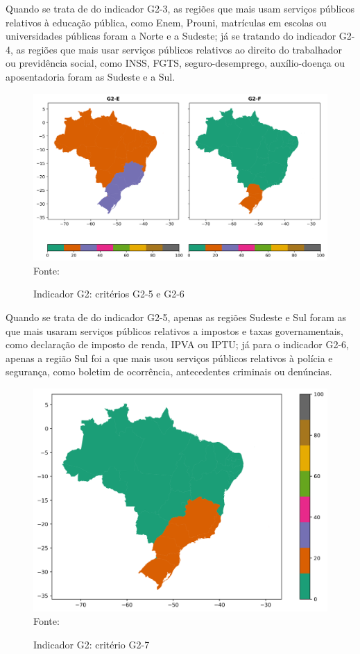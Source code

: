 Quando se trata de do indicador G2-3, as regiões que mais usam serviços públicos relativos à educação pública, como Enem, Prouni, matrículas em escolas ou universidades públicas foram a Norte e a Sudeste; já se tratando do indicador G2-4, as regiões que mais usar serviços públicos relativos ao direito do trabalhador ou previdência social, como INSS, FGTS, seguro-desemprego, auxílio-doença ou aposentadoria foram as Sudeste e a Sul.

\begin{figure}[H]
	\centering
	\caption{Indicador G2: critérios G2-5 e G2-6}
	\includegraphics[width=1\linewidth]{figuras/mapa_coropleto_tic_domicilio_g2_E_F.png}
	\label{fig:mapa_coropleto_tic_domicilio_g2_E_F}
	\footnotesize{Fonte: \cite{tic_domicilios_2024_g2}}
\end{figure}

Quando se trata de do indicador G2-5, apenas as regiões Sudeste e Sul foram as que mais usaram serviços públicos relativos a impostos e taxas governamentais, como declaração de imposto de renda, IPVA ou IPTU; já para o indicador G2-6, apenas a região Sul foi a que mais usou serviços públicos relativos à polícia e segurança, como boletim de ocorrência, antecedentes criminais ou denúncias.

\begin{figure}[H]
	\centering
	\caption{Indicador G2: critério G2-7}
	\includegraphics[width=1\linewidth]{figuras/mapa_coropleto_tic_domicilio_g2_G.png}
	\label{fig:mapa_coropleto_tic_domicilio_g2_G}
	\footnotesize{Fonte: \cite{tic_domicilios_2024_g2}}
\end{figure}

